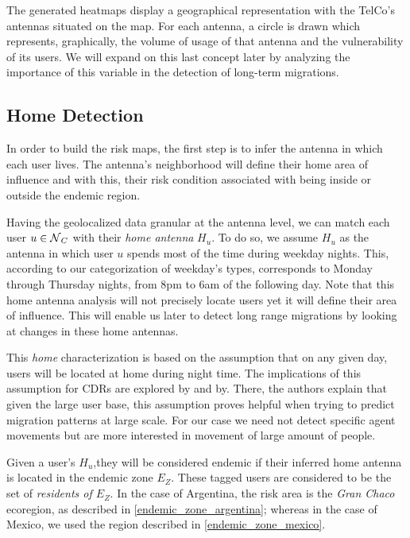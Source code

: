 The generated heatmaps display a geographical representation with the TelCo's antennas situated on the map.
For each antenna, a circle is drawn which represents, graphically, the volume of usage of that antenna and the vulnerability of its users.
We will expand on this last concept later by analyzing the importance of this variable in the detection of long-term migrations.

\subsection{Home Detection}\label{subsection:home_detection}

In order to build the risk maps, the first step is to infer the antenna in which each user lives.
The antenna's neighborhood will define their home area of influence and with this, their risk condition associated with being inside or outside the endemic region.

Having the geolocalized data granular at the antenna level, we can match each user $u \in \operatorname{\mathcal{N}}_C$ with their \textit{home antenna} $H_u$.
To do so, we assume $H_u$ as the antenna in which user $u$ spends most of the time during weekday nights.
This, according to our categorization of weekday's types, corresponds to Monday through Thursday nights, from 8pm to 6am of the following day.
Note that this home antenna analysis will not precisely locate users yet it will define their area of influence.
This will enable us later to detect long range migrations by looking at changes in these home antennas.

This \textit{home} characterization is based on the assumption that on any given day, users will be located at home during night time.
The implications of this assumption for CDRs are explored by \citep{sarraute2015socialevents} and by\citep{csaji2012exploring}.
There, the authors explain that given the large user base, this assumption proves helpful when trying to predict migration patterns at large scale.
For our case we need not detect specific agent movements but are more interested in movement of large amount of people.

Given a user's $H_u$,they will be considered endemic if their inferred home antenna is located in the endemic zone $E_Z$.
These tagged users are considered to be the set of \textit{residents of $E_Z$}.
In the case of Argentina, the risk area is the \textit{Gran Chaco} ecoregion, as described in \cref{endemic_zone_argentina};
whereas in the case of Mexico, we used the region described in \cref{endemic_zone_mexico}.


